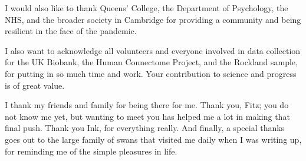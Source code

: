 I would also like to thank Queens' College, the Department of Psychology, the NHS, and the broader society in Cambridge for providing a community and being resilient in the face of the pandemic.

I also want to acknowledge all volunteers and everyone involved in data collection for the UK Biobank, the Human Connectome Project, and the Rockland sample, for putting in so much time and work.
Your contribution to science and progress is of great value.

I thank my friends and family for being there for me.
Thank you, Fitz; you do not know me yet, but wanting to meet you has helped me a lot in making that final push.
Thank you Ink, for everything really.
And finally, a special thanks goes out to the large family of swans that visited me daily when I was writing up, for reminding me of the simple pleasures in life.
